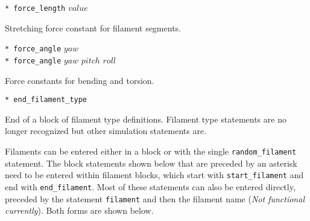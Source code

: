 \documentclass {scrbook}
\newcommand {\ttt} {\texttt}
\begin{document}
\begin{description}
\item{\ttt{* force\_length} $value$}

Stretching force constant for filament segments.

\item{\ttt{* force\_angle} $yaw$\\
\ttt{* force\_angle} $yaw$ $pitch$ $roll$}

Force constants for bending and torsion.

\item{\ttt{* end\_filament\_type}}

End of a block of filament type definitions. Filament type statements are no longer recognized but other simulation statements are.

\end{description}

Filaments can be entered either in a block or with the single \ttt{random\_filament} statement. The block statements shown below that are preceded by an asterisk need to be entered within filament blocks, which start with \ttt{start\_filament} and end with \ttt{end\_filament}. Most of these statements can also be entered directly, preceded by the statement \ttt{filament} and then the filament name (\textit{Not functional currently}). Both forms are shown below.
\end{document}
